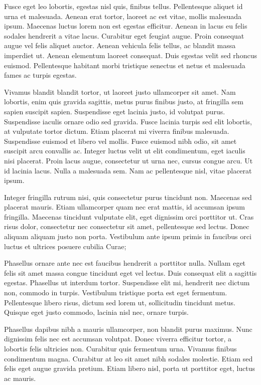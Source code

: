 \documentclass{amsbook}
\begin{document}
Fusce eget leo lobortis, egestas nisl quis, finibus tellus. Pellentesque aliquet id urna et malesuada. Aenean erat tortor, laoreet ac est vitae, mollis malesuada ipsum. Maecenas luctus lorem non est egestas efficitur. Aenean in lacus eu felis sodales hendrerit a vitae lacus. Curabitur eget feugiat augue. Proin consequat augue vel felis aliquet auctor. Aenean vehicula felis tellus, ac blandit massa imperdiet ut. Aenean elementum laoreet consequat. Duis egestas velit sed rhoncus euismod. Pellentesque habitant morbi tristique senectus et netus et malesuada fames ac turpis egestas.

Vivamus blandit blandit tortor, ut laoreet justo ullamcorper sit amet. Nam lobortis, enim quis gravida sagittis, metus purus finibus justo, at fringilla sem sapien suscipit sapien. Suspendisse eget lacinia justo, id volutpat purus. Suspendisse iaculis ornare odio sed gravida. Fusce lacinia turpis sed elit lobortis, at vulputate tortor dictum. Etiam placerat mi viverra finibus malesuada. Suspendisse euismod et libero vel mollis. Fusce euismod nibh odio, sit amet suscipit arcu convallis ac. Integer luctus velit ut elit condimentum, eget iaculis nisi placerat. Proin lacus augue, consectetur ut urna nec, cursus congue arcu. Ut id lacinia lacus. Nulla a malesuada sem. Nam ac pellentesque nisl, vitae placerat ipsum.

Integer fringilla rutrum nisi, quis consectetur purus tincidunt non. Maecenas sed placerat mauris. Etiam ullamcorper quam nec erat mattis, id accumsan ipsum fringilla. Maecenas tincidunt vulputate elit, eget dignissim orci porttitor ut. Cras risus dolor, consectetur nec consectetur sit amet, pellentesque sed lectus. Donec aliquam aliquam justo non porta. Vestibulum ante ipsum primis in faucibus orci luctus et ultrices posuere cubilia Curae;

Phasellus ornare ante nec est faucibus hendrerit a porttitor nulla. Nullam eget felis sit amet massa congue tincidunt eget vel lectus. Duis consequat elit a sagittis egestas. Phasellus ut interdum tortor. Suspendisse elit mi, hendrerit nec dictum non, commodo in turpis. Vestibulum tristique porta est eget fermentum. Pellentesque libero risus, dictum sed lorem ut, sollicitudin tincidunt metus. Quisque eget justo commodo, lacinia nisl nec, ornare turpis.

Phasellus dapibus nibh a mauris ullamcorper, non blandit purus maximus. Nunc dignissim felis nec est accumsan volutpat. Donec viverra efficitur tortor, a lobortis felis ultricies non. Curabitur quis fermentum urna. Vivamus finibus condimentum magna. Curabitur at leo sit amet nibh sodales molestie. Etiam sed felis eget augue gravida pretium. Etiam libero nisl, porta ut porttitor eget, luctus ac mauris.
\end{document}
